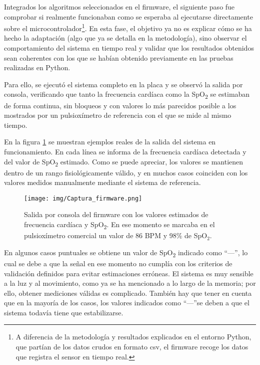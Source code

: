 Integrados los algoritmos seleccionados en el firmware, el siguiente paso fue comprobar si realmente funcionaban como se esperaba al ejecutarse directamente sobre el microcontrolador\footnote{A diferencia de la metodología y resultados explicados en el entorno Python, que partían de los datos crudos en formato csv, el firmware recoge los datos que registra el sensor en tiempo real.}. En esta fase, el objetivo ya no es explicar cómo se ha hecho la adaptación (algo que ya se detalla en la metodología), sino observar el comportamiento del sistema en tiempo real y validar que los resultados obtenidos sean coherentes con los que se habían obtenido previamente en las pruebas realizadas en Python.

Para ello, se ejecutó el sistema completo en la placa y se observó la salida por consola, verificando que tanto la frecuencia cardíaca como la SpO\textsubscript{2} se estimaban de forma continua, sin bloqueos y con valores lo más parecidos posible a los mostrados por un pulsioxímetro de referencia con el que se mide al mismo tiempo. 

En la figura \ref{fig:firmware_resultados} se muestran ejemplos reales de la salida del sistema en funcionamiento. En cada línea se informa de la frecuencia cardíaca detectada y del valor de SpO\textsubscript{2} estimado. Como se puede apreciar, los valores se mantienen dentro de un rango fisiológicamente válido, y en muchos casos coinciden con los valores medidos manualmente mediante el sistema de referencia.

\begin{figure}[H]
\centering
\texttt{[image: img/Captura\_firmware.png]}
\caption{Salida por consola del firmware con los valores estimados de frecuencia cardíaca y SpO\textsubscript{2}. En ese momento se marcaba en el pulsioxímetro comercial un valor de 86 BPM y 98\% de SpO$_2$.}
\label{fig:firmware_resultados}
\end{figure}

En algunos casos puntuales se obtiene un valor de SpO\textsubscript{2} indicado como ``---'', lo cual se debe a que la señal en ese momento no cumplía con los criterios de validación definidos para evitar estimaciones erróneas. El sistema es muy sensible a la luz y al movimiento, como ya se ha mencionado a lo largo de la memoria; por ello, obtener mediciones válidas es complicado. También hay que tener en cuenta que en la mayoría de los casos, los valores indicados como ``---''se deben a que el sistema todavía tiene que estabilizarse.


